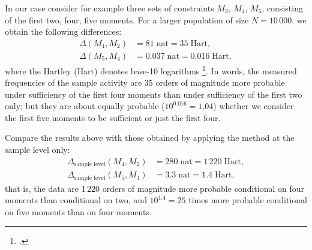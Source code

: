 \documentclass[\ifafour a4paper,12pt,\else a5paper,10pt,\fi%
onecolumn,oneside,article,%
british%
]{memoir}
\theoremstyle{remark}
\theoremstyle{innote}
\newcommand*{\citep}{\footcites}
\renewcommand*{\|}{\nonscript\,\vert\nonscript\;\mathopen{}}
\newcommand*{\sect}{\S}%
\newcommand*{\ydi}{\varDelta}
\newcommand*{\nat}{\textrm{nat}}
\newcommand*{\hart}{\textrm{Hart}}
\begin{document}
%
%
% 
%
%

\bigskip

In our case consider for example three sets of constraints $M_{2}$,
$M_{4}$, $M_{5}$, consisting of the first two, four, five moments. For a
larger population of size $N=10\,000$, we obtain the following differences:
\begin{equation}
  \label{eq:diff_suff_N}
  \begin{split}
  \ydi(M_{4},M_{2}) &= 81\;\nat = 35\;\hart,
\\    \ydi(M_{5},M_{4}) &= 0.037\;\nat = 0.016\;\hart,
  \end{split}
\end{equation}
where the Hartley ($\hart$) denotes base-10 logarithms
\citep[\sect~C.4]{iso2009}[it was called \enquote{ban} and used by Turing
and Good in their code-breaking work at Bletchley
Park:][]{good1985,good1950,good1969}[\sect~4.2]{jaynes1994_r2003}. In
words, the measured frequencies of the sample activity are 35 orders of
magnitude more probable under sufficiency of the first four moments than
under sufficiency of the first two only; but they are about equally
probable ($10^{0.016} = 1.04$) whether we consider the first five moments
to be sufficient or just the first four.

Compare the results above with those obtained by applying the method at the
sample level only:
\begin{equation}
  \label{eq:diff_suff_n}
  \begin{split}
  \ydi_{\text{sample level}}(M_{4},M_{2}) &= 280\;\nat = 1\,220\;\hart,
\\    \ydi_{\text{sample level}}(M_{5},M_{4}) &= 3.3\;\nat = 1.4\;\hart,
\end{split}
\end{equation}
that is, the data are 1\,220 orders of magnitude more probable conditional
on four moments than conditional on two, and $10^{1.4}=25$ times more
probable conditional on five moments than on four moments.
\end{document}
